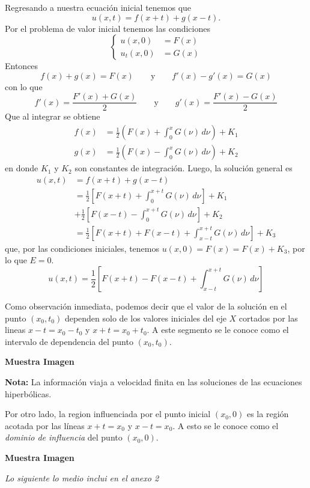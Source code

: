Regresando a nuestra ecuación inicial tenemos que
\[
u(x,t) = f(x+t) + g(x-t).
\]
Por el problema de valor inicial tenemos las condiciones
\[
\begin{cases}
u(x,0) &= F(x) \\
u_t(x,0) &= G(x) 
\end{cases}
\]
Entonces
\[
f(x) + g(x) = F(x) \qquad \text{y} \qquad f'(x) - g'(x) = G(x)
\]
con lo que
\[
f'(x) = \frac{F'(x) + G(x)}{2} \qquad \text{y} \qquad g'(x) = \frac{F'(x) - G(x)}{2}
\]
Que al integrar se obtiene
\begin{align*}
f(x) &= \frac{1}{2} \left( F(x) + \int_0^x G(\nu) \,d\nu \right) + K_1 \\
g(x) &= \frac{1}{2} \left( F(x) - \int_0^x G(\nu) \,d\nu \right) + K_2 
\end{align*}
en donde $K_1$ y $K_2$ son constantes de integración. Luego, la solución general es
\begin{align*}
u(x,t) &= f(x+t) + g(x-t) \\
	   &= \frac{1}{2} \left[ F(x+t) + \int_0^{x+t} G(\nu) \,d\nu \right] + K_1 \\
	   &+ \frac{1}{2} \left[ F(x-t) - \int_0^{x+t} G(\nu) \,d\nu \right] + K_2 \\
	   &= \frac{1}{2} \left[ F(x+t) + F(x-t) + \int_{x-t}^{x+t} G(\nu) \,d\nu \right] + K_3
\end{align*}
que, por las condiciones iniciales, tenemos $u(x,0) = F(x) = F(x) + K_3$, por lo que $E=0$.
\[
u(x,t) = \frac{1}{2} \left[ F(x+t) - F(x-t) + \int_{x-t}^{x+t} G(\nu) \,d\nu \right]
\]

Como observación inmediata, podemos decir que el valor de la solución en el punto $(x_0,t_0)$ dependen solo de los valores iniciales del eje $X$ cortados por las lineas $x-t=x_0-t_0$ y $x+t=x_0+t_0$. A este segmento se le conoce como el intervalo de dependencia del punto $(x_0, t_0)$.

\textbf{Muestra Imagen}

\textbf{Nota:} La información viaja a velocidad finita en las soluciones de las ecuaciones hiperbólicas.

Por otro lado, la region influenciada por el punto inicial $(x_0, 0)$ es la región acotada por las líneas $x+t = x_0$ y $x-t=x_0$. A esto se le conoce como el \textit{dominio de influencia} del punto $(x_0, 0)$.

\textbf{Muestra Imagen}




\textit{Lo siguiente lo medio inclui en el anexo 2}

